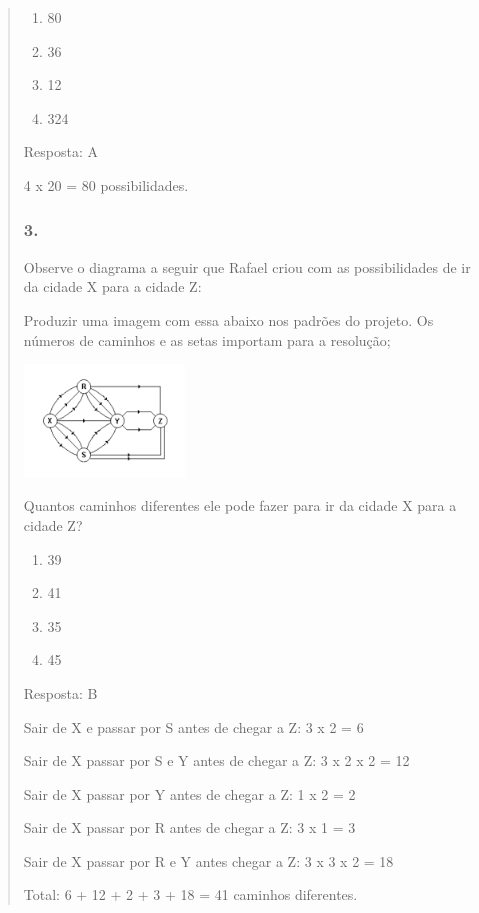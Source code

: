 \begin{enumerate}
\begin{escolha}
\begin{enumerate}
\begin{itemize}
\begin{itemize}
\begin{escolha}
\begin{quote}
\begin{escolha}
{\begin{enumerate}
\def\labelenumi{\alph{enumi})}
\item
  80
\item
  36
\item
  12
\item
  324
\end{enumerate}

Resposta: A

4 x 20 = 80 possibilidades.

\subsubsection{3.}\label{section-142}

Observe o diagrama a seguir que Rafael criou com as possibilidades de ir
da cidade X para a cidade Z:

Produzir uma imagem com essa abaixo nos padrões do projeto. \textbar{}Os
números de caminhos e as setas importam para a resolução;

\includegraphics[width=1.68348in,height=1.18344in]{media/image141.png}

Quantos caminhos diferentes ele pode fazer para ir da cidade X para a
cidade Z?

\begin{enumerate}
\def\labelenumi{\alph{enumi})}
\item
  39
\item
  41
\item
  35
\item
  45
\end{enumerate}

Resposta: B

Sair de X e passar por S antes de chegar a Z: 3 x 2 = 6

Sair de X passar por S e Y antes de chegar a Z: 3 x 2 x 2 = 12

Sair de X passar por Y antes de chegar a Z: 1 x 2 = 2

Sair de X passar por R antes de chegar a Z: 3 x 1 = 3

Sair de X passar por R e Y antes chegar a Z: 3 x 3 x 2 = 18

Total: 6 + 12 + 2 + 3 + 18 = 41 caminhos diferentes.

}
\end{escolha}
\end{quote}
\end{escolha}
\end{itemize}
\end{itemize}
\end{enumerate}
\end{escolha}
\end{enumerate}
